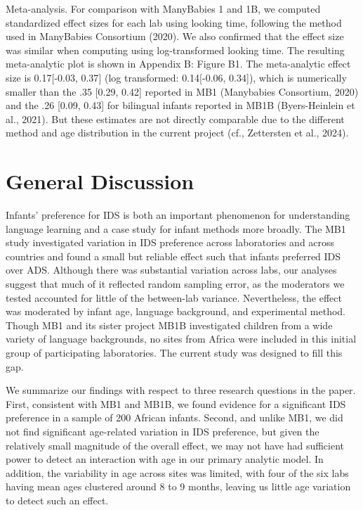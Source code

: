 \documentclass[
  ,man,floatsintext]{apa6}
\begin{document}
Meta-analysis. For comparison with ManyBabies 1 and 1B, we computed standardized effect sizes for each lab using looking time, following the method used in ManyBabies Consortium (2020). We also confirmed that the effect size was similar when computing using log-transformed looking time. The resulting meta-analytic plot is shown in Appendix B: Figure B1. The meta-analytic effect size is 0.17{[}-0.03, 0.37{]} (log transformed: 0.14{[}-0.06, 0.34{]}), which is numerically smaller than the .35 {[}0.29, 0.42{]} reported in MB1 (Manybabies Consortium, 2020) and the .26 {[}0.09, 0.43{]} for bilingual infants reported in MB1B (Byers-Heinlein et al., 2021). But these estimates are not directly comparable due to the different method and age distribution in the current project (cf., Zettersten et al., 2024).

\hypertarget{general-discussion}{%
\section{General Discussion}\label{general-discussion}}

Infants' preference for IDS is both an important phenomenon for understanding language learning and a case study for infant methods more broadly. The MB1 study investigated variation in IDS preference across laboratories and across countries and found a small but reliable effect such that infants preferred IDS over ADS. Although there was substantial variation across labs, our analyses suggest that much of it reflected random sampling error, as the moderators we tested accounted for little of the between-lab variance. Nevertheless, the effect was moderated by infant age, language background, and experimental method. Though MB1 and its sister project MB1B investigated children from a wide variety of language backgrounds, no sites from Africa were included in this initial group of participating laboratories. The current study was designed to fill this gap.

We summarize our findings with respect to three research questions in the paper. First, consistent with MB1 and MB1B, we found evidence for a significant IDS preference in a sample of 200 African infants. Second, and unlike MB1, we did not find significant age-related variation in IDS preference, but given the relatively small magnitude of the overall effect, we may not have had sufficient power to detect an interaction with age in our primary analytic model. In addition, the variability in age across sites was limited, with four of the six labs having mean ages clustered around 8 to 9 months, leaving us little age variation to detect such an effect.
\end{document}
